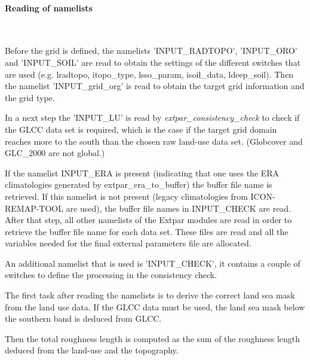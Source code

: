 \documentclass[a4paper,10pt,DIV14,BCOR1cm,titlepage,twoside]{scrartcl}
\begin{document}
\paragraph{Reading of namelists}\ \par\medskip\noindent
Before the grid is defined, the namelists 'INPUT\_RADTOPO', 'INPUT\_ORO' and 'INPUT\_SOIL' are read to obtain the settings of the different switches that are used (e.g. lradtopo, itopo\_type, lsso\_param, isoil\_data, ldeep\_soil). Then the namelist 'INPUT\_grid\_org' is read to obtain the target grid information and the grid type.\par\medskip\noindent
In a next step the 'INPUT\_LU' is read by \textit{extpar\_consistency\_check} to check if the GLCC data set is required, which is the case if the target grid domain reaches more to the south than the chosen raw land-use data set. (Globcover and GLC\_2000 are not global.)\par\medskip\noindent
If the namelist INPUT\_ERA is present (indicating that one uses the ERA climatologies generated by extpar\_era\_to\_buffer) the buffer file name is retrieved. If this namelist is not present (legacy climatologies from ICON-REMAP-TOOL are used), the buffer file names in INPUT\_CHECK are read.
After that step, all other namelists of the Extpar modules are read in order to retrieve the buffer file name for each data set. These files are read and all the variables needed for the final external parameters file are allocated. \par\medskip\noindent\par\medskip\noindent
An additional namelist that is used is 'INPUT\_CHECK', it contains a couple of switches to define the processing in the consistency check. \par\medskip\noindent
The first task after reading the namelists is to derive the correct land sea mask from the land use data. If the GLCC data must be used, the land sea mask below the southern band is deduced from GLCC.\par\medskip\noindent
Then the total roughness length is computed as the sum of the roughness length deduced from the land-use and the topography.\par\medskip\noindent
\end{document}

